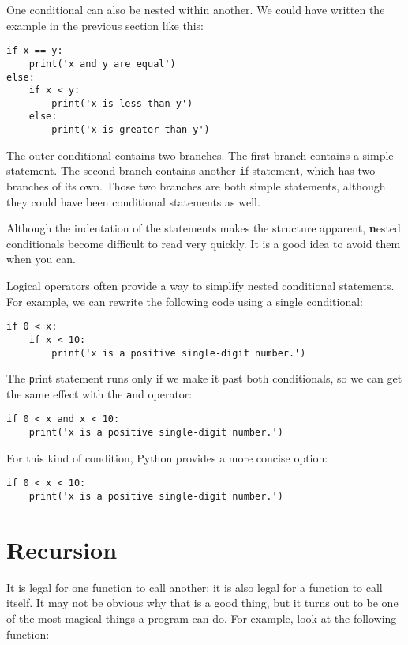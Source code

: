 \documentclass[
DIV=11,
fontsize=12,
twoside,
headinclude=false,
titlepage=firstiscover,
abstract=true,
headsepline=true,
footsepline=true,
chapterprefix=true, %
headings=big,
bibliography=totoc,%
captions=tableheading
]{scrbook}
\theoremstyle{definition}
\begin{document}
One conditional can also be nested within another.  We could have
written the example in the previous section like this:

\begin{lstlisting}
if x == y:
    print('x and y are equal')
else:
    if x < y:
        print('x is less than y')
    else:
        print('x is greater than y')
\end{lstlisting}
%
The outer conditional contains two branches.  The
first branch contains a simple statement.  The second branch
contains another {\texttt if} statement, which has two branches of its
own.  Those two branches are both simple statements,
although they could have been conditional statements as well.

Although the indentation of the statements makes the structure
apparent, {\textbf nested conditionals} become difficult to read very
quickly.  It is a good idea to avoid them when you can.

Logical operators often provide a way to simplify nested conditional
statements.  For example, we can rewrite the following code using a
single conditional:

\begin{lstlisting}
if 0 < x:
    if x < 10:
        print('x is a positive single-digit number.')
\end{lstlisting}
%
The {\texttt print} statement runs only if we make it past both
conditionals, so we can get the same effect with the {\texttt and} operator:

\begin{lstlisting}
if 0 < x and x < 10:
    print('x is a positive single-digit number.')
\end{lstlisting}

For this kind of condition, Python provides a more concise option:

\begin{lstlisting}
if 0 < x < 10:
    print('x is a positive single-digit number.')
\end{lstlisting}


\section{Recursion}
\label{recursion}

It is legal for one function to call another;
it is also legal for a function to call itself.  It may not be obvious
why that is a good thing, but it turns out to be one of the most
magical things a program can do.
For example, look at the following function:
\end{document}
